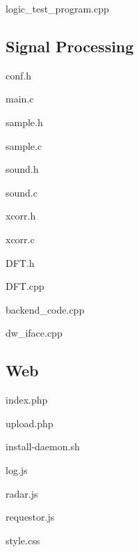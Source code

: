 \documentclass[a4paper]{article}
\begin{document}
logic\_test\_program.cpp


\subsection{Signal Processing}
conf.h


main.c


sample.h


sample.c


sound.h


sound.c


xcorr.h


xcorr.c


DFT.h


DFT.cpp


backend\_code.cpp


dw\_iface.cpp


\subsection{Web}
index.php


upload.php


install-daemon.sh


log.js


radar.js


requestor.js


style.css

\end{document}
